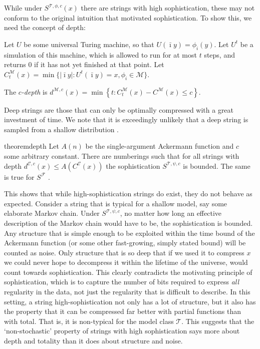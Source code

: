 \documentclass{style/llncs}
\newcommand{\M}{\mathscr M}
\newcommand{\C}{\mathscr C}
\newcommand{\T}{\mathscr T}
\newcommand{\F}{\mathscr F}
\newcommand{\s}{S}
\begin{document}
While under $S^{\T, \phi, c}(x)$ there are strings with high sophistication, these may not conform to the original intuition that motivated sophistication. To show this, we need the concept of depth:

\begin{definition}\belowdisplayskip=-12pt
Let $U$ be some universal Turing machine, so that $U(\bar\imath y) = \phi_i(y)$. Let $U^t$ be a simulation of this machine, which is allowed to run for at most $t$ steps, and returns $0$ if it has not yet finished at that point. Let $C^\M_t(x) = \min\{|\bar\imath y| : U^t(\bar\imath y) = x, \phi_i \in \M\}$.

The \emph{$c$-depth} is $d^{\M,c}(x) = \min \left\{t : C^\M_t(x) - C^\M(x) \leq c \right\}$.
\end{definition}
Deep strings are those that can only be optimally compressed with a great investment of time. We note that it is exceedingly unlikely that a deep string is sampled from a shallow distribution \cite{bloem2014safe,bennett1988logical}.
 
\begin{restatable}{theorem}{depth}
Let $A(n)$ be the single-argument Ackermann function and $c$ some arbitrary constant. There are numberings such that for all strings with depth $d^{\C,c}(x) \leq A(C^\C(x))$ the sophistication $\s^{\T, \psi, c}$ is bounded. The same is true for $\s^{\F}$ .
\end{restatable}
\noindent This shows that while high-sophistication strings do exist, they do not behave as expected. Consider a string that is typical for a shallow model, say some elaborate Markov chain. Under $\s^{\T,\psi,c}$, no matter how long an effective description of the Markov chain would have to be, the sophistication is bounded. Any structure that is simple enough to be exploited within the time bound of the Ackermann function (or some other fast-growing, simply stated bound) will be counted as noise. Only structure that is so deep that if we used it to compress $x$ we could never hope to decompress it within the lifetime of the universe, would count towards sophistication. 
This clearly contradicts the motivating principle of sophistication, which is to capture the number of bits required to express \emph{all} regularity in the data, not just the regularity that is difficult to describe. 
In this setting, a string high-sophistication not only has a lot of structure, but it also has the property that it can be compressed far better with partial functions than with total. That is, it is non-typical for the model class $\T$. This suggests that the `non-stochastic' property of strings with high sophistication \cite{shen1983concept,vereshchagin2004kolmogorov} says more about depth and totality than it does about structure and noise.
\end{document}
